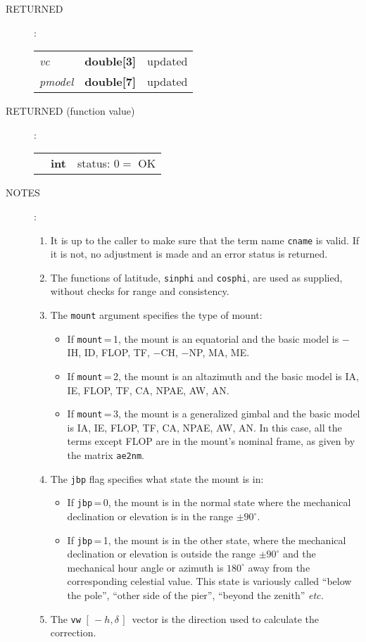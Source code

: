 \documentclass[12pt,fleqn,twoside]{article}
\renewcommand{\_}{{\tt\char'137}}     %
\newcommand{\mhadec}     {$[\,-h,\delta\,]$}
\newcommand{\args}[2]
{
  \goodbreak
  \begin{description}
  \item[#1]: \\[1.5ex] \nopagebreak
    \hspace*{-0.9em}
    \begin{tabular}{p{4.5em}p{5.8em}p{23.5em}}
      #2
    \end{tabular}
  \end{description}
  \vspace{-3ex}
}
\newcommand{\spec}[3]
{
  {\em {#1}} & {\bf \mbox{#2}} & {#3}
}
\newcommand{\notes}[1]
{
  \goodbreak
  \begin{description}
    \item[NOTES]: \nopagebreak
        #1
  \end{description}
  \vspace{-3ex}
}
\begin{document}
\args{RETURNED}
{
\spec{vc}{double[3]}{updated} \\
\spec{pmodel}{double[7]}{updated}
}
\args{RETURNED \rm (function value)}
{
\spec{}{int}{status: $0 =$ OK}
}
\notes{
\begin{enumerate}
\setlength{\parskip}{\medskipamount}
\item It is up to the caller to make sure that the term name
      {\tt cname} is valid.  If it is not, no adjustment is made
      and an error status is returned.
\item The functions of latitude, {\tt sinphi} and {\tt cosphi}, are used as
      supplied, without checks for range and consistency.
\item The {\tt mount} argument specifies the type of mount:
      \begin{itemize}
      \item If {\tt mount}\,=\,1, the mount is an equatorial and the
            basic model is $-$IH, ID, FLOP, TF, $-$CH, $-$NP, MA, ME.
      \item If {\tt mount}\,=\,2, the mount is an altazimuth and the
            basic model is IA, IE, FLOP, TF, CA, NPAE, AW, AN.
      \item If {\tt mount}\,=\,3, the mount is a generalized gimbal
            and the basic model is
            IA, IE, FLOP, TF, CA, NPAE, AW, AN.  In this case, all
            the terms except FLOP are in the mount's nominal frame,
            as given by the matrix {\tt ae2nm}.
      \end{itemize}
\item The {\tt jbp} flag specifies what state the mount is in:
      \begin{itemize}
      \item If {\tt jbp}\,=\,0, the mount is in the normal state
            where the mechanical declination or elevation is in the
            range $\pm90^\circ$.
      \item If {\tt jbp}\,=\,1, the mount is in the other state,
            where the mechanical
            declination or elevation is outside the range $\pm90^\circ$
            and the mechanical hour angle or azimuth is $180^\circ$
            away from the corresponding celestial value.  This state is
            variously called ``below the pole'', ``other side of the pier'',
            ``beyond the zenith'' {\it etc.}
      \end{itemize}
\item The {\tt vw} \mhadec\ vector is the direction used to calculate the
      correction.

\end{enumerate}}
\end{document}
